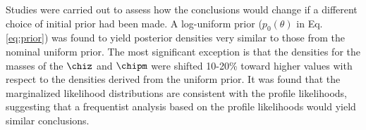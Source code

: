 Studies were carried out to assess how the conclusions would change if a 
different choice of initial prior had been made. A log-uniform prior ($p_0(\theta)$ in Eq. \ref{eq:prior}) was found to yield posterior densities very similar to those from the nominal uniform prior. The most significant exception is that 
the densities for the masses of the $\chiz$ and  $\chipm$ were shifted 10-20\% 
toward higher values with respect to the densities derived from the
uniform prior. It was found that the marginalized 
likelihood distributions are consistent with the profile likelihoods, suggesting that a 
frequentist analysis based on the profile likelihoods would yield similar conclusions.

